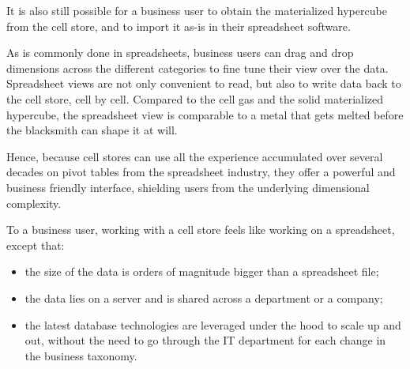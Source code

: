\documentclass{acm_proc_article-sp}
\begin{document}
It is also still possible for a business user to obtain the materialized hypercube from the cell store, and to import it as-is in their spreadsheet software.

As is commonly done in spreadsheets, business users can drag and drop dimensions across the different categories to fine tune their view over the data. Spreadsheet views are not only convenient to read, but also to write data back to the cell store, cell by cell. Compared to the cell gas and the solid materialized hypercube, the spreadsheet view is comparable to a metal that gets melted before the blacksmith can shape it at will.

Hence, because cell stores can use all the experience accumulated over several decades on pivot tables from the spreadsheet industry, they offer a powerful and business friendly interface, shielding users from the underlying dimensional complexity.

To a business user, working with a cell store feels like working on a spreadsheet, except that:

\vspace{-\topsep}
\begin{itemize}
\item the size of the data is orders of magnitude bigger than a spreadsheet file;
\item the data lies on a server and is shared across a department or a company;
\item the latest database technologies are leveraged under the hood to scale up and out, without the need to go through the IT department for each change in the business taxonomy.
\end{itemize}
\end{document}
